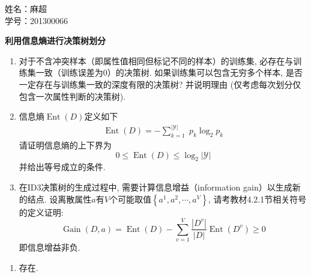 \documentclass[answers]{exam}  %
\begin{document}
\Large
\noindent
姓名：麻超 \\
学号：201300066 \\
\begin{questions}
    \question [20] \textbf{利用信息熵进行决策树划分}

    \begin{enumerate}
        \item  对于不含冲突样本（即属性值相同但标记不同的样本）的训练集, 必存在与训练集一致（训练误差为0）的决策树. 如果训练集可以包含无穷多个样本, 是否一定存在与训练集一致的深度有限的决策树? 并说明理由 (仅考虑每次划分仅包含一次属性判断的决策树).
        \item
              信息熵$\operatorname{Ent}(D)$定义如下
              \begin{align}
                  \operatorname{Ent}(D)=-\sum_{k=1}^{|\mathcal{Y}|}\; p_{k} \log_{2} p_{k}\label{ch4_eq:entropy}
              \end{align}
              请证明信息熵的上下界为
              \begin{equation}
                  0 \leq \operatorname{Ent}(D)\leq \log _{2}|\mathcal{Y}|
              \end{equation}
              并给出等号成立的条件.
        \item  在ID3决策树的生成过程中, 需要计算信息增益（information gain）以生成新的结点. 设离散属性$a$有$V$个可能取值$\left\{a^{1}, a^{2}, \cdots, a^{V}\right\}$, 请考教材4.2.1节相关符号的定义证明:
              \begin{equation}
                  \operatorname{Gain}(D, a)=\operatorname{Ent}(D)-\sum_{v=1}^{V} \frac{\left|D^{v}\right|}{|D|} \operatorname{Ent}\left(D^{v}\right) \geq 0
              \end{equation}
              即信息增益非负.
    \end{enumerate}
    \begin{solution}
        \begin{enumerate}
            \item 存在.


\end{enumerate}
\end{solution}
\end{questions}
\end{document}
